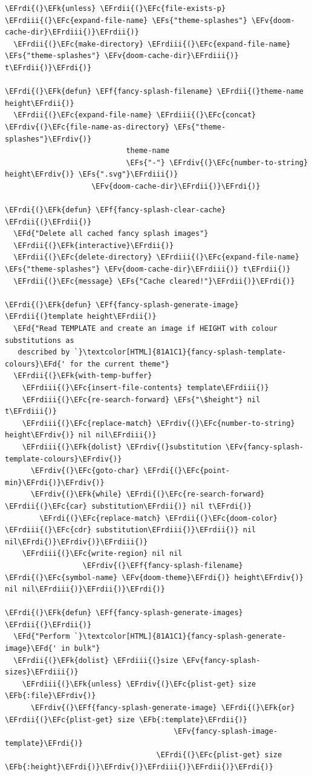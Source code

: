 \documentclass{scrartcl}
\newcommand{\EFk}[1]{\textcolor{EFk}{#1}} %
\newcommand{\EFd}[1]{\textcolor{EFd}{#1}} %
\newcommand{\EFs}[1]{\textcolor{EFs}{#1}} %
\newcommand{\EFb}[1]{\textcolor{EFb}{#1}} %
\newcommand{\EFc}[1]{\textcolor{EFc}{#1}} %
\newcommand{\EFv}[1]{\textcolor{EFv}{#1}} %
\newcommand{\EFf}[1]{\textcolor{EFf}{#1}} %
\newcommand{\EFrdi}[1]{#1} %
\newcommand{\EFrdii}[1]{#1} %
\newcommand{\EFrdiii}[1]{#1} %
\newcommand{\EFrdiv}[1]{#1} %
\begin{document}
\begin{Code}
\begin{Verbatim}[]
\EFrdi{(}\EFk{unless} \EFrdii{(}\EFc{file-exists-p} \EFrdiii{(}\EFc{expand-file-name} \EFs{"theme-splashes"} \EFv{doom-cache-dir}\EFrdiii{)}\EFrdii{)}
  \EFrdii{(}\EFc{make-directory} \EFrdiii{(}\EFc{expand-file-name} \EFs{"theme-splashes"} \EFv{doom-cache-dir}\EFrdiii{)} t\EFrdii{)}\EFrdi{)}

\EFrdi{(}\EFk{defun} \EFf{fancy-splash-filename} \EFrdii{(}theme-name height\EFrdii{)}
  \EFrdii{(}\EFc{expand-file-name} \EFrdiii{(}\EFc{concat} \EFrdiv{(}\EFc{file-name-as-directory} \EFs{"theme-splashes"}\EFrdiv{)}
                            theme-name
                            \EFs{"-"} \EFrdiv{(}\EFc{number-to-string} height\EFrdiv{)} \EFs{".svg"}\EFrdiii{)}
                    \EFv{doom-cache-dir}\EFrdii{)}\EFrdi{)}

\EFrdi{(}\EFk{defun} \EFf{fancy-splash-clear-cache} \EFrdii{(}\EFrdii{)}
  \EFd{"Delete all cached fancy splash images"}
  \EFrdii{(}\EFk{interactive}\EFrdii{)}
  \EFrdii{(}\EFc{delete-directory} \EFrdiii{(}\EFc{expand-file-name} \EFs{"theme-splashes"} \EFv{doom-cache-dir}\EFrdiii{)} t\EFrdii{)}
  \EFrdii{(}\EFc{message} \EFs{"Cache cleared!"}\EFrdii{)}\EFrdi{)}

\EFrdi{(}\EFk{defun} \EFf{fancy-splash-generate-image} \EFrdii{(}template height\EFrdii{)}
  \EFd{"Read TEMPLATE and create an image if HEIGHT with colour substitutions as
   described by `}\textcolor[HTML]{81A1C1}{fancy-splash-template-colours}\EFd{' for the current theme"}
  \EFrdii{(}\EFk{with-temp-buffer}
    \EFrdiii{(}\EFc{insert-file-contents} template\EFrdiii{)}
    \EFrdiii{(}\EFc{re-search-forward} \EFs{"\$height"} nil t\EFrdiii{)}
    \EFrdiii{(}\EFc{replace-match} \EFrdiv{(}\EFc{number-to-string} height\EFrdiv{)} nil nil\EFrdiii{)}
    \EFrdiii{(}\EFk{dolist} \EFrdiv{(}substitution \EFv{fancy-splash-template-colours}\EFrdiv{)}
      \EFrdiv{(}\EFc{goto-char} \EFrdi{(}\EFc{point-min}\EFrdi{)}\EFrdiv{)}
      \EFrdiv{(}\EFk{while} \EFrdi{(}\EFc{re-search-forward} \EFrdii{(}\EFc{car} substitution\EFrdii{)} nil t\EFrdi{)}
        \EFrdi{(}\EFc{replace-match} \EFrdii{(}\EFc{doom-color} \EFrdiii{(}\EFc{cdr} substitution\EFrdiii{)}\EFrdii{)} nil nil\EFrdi{)}\EFrdiv{)}\EFrdiii{)}
    \EFrdiii{(}\EFc{write-region} nil nil
                  \EFrdiv{(}\EFf{fancy-splash-filename} \EFrdi{(}\EFc{symbol-name} \EFv{doom-theme}\EFrdi{)} height\EFrdiv{)} nil nil\EFrdiii{)}\EFrdii{)}\EFrdi{)}

\EFrdi{(}\EFk{defun} \EFf{fancy-splash-generate-images} \EFrdii{(}\EFrdii{)}
  \EFd{"Perform `}\textcolor[HTML]{81A1C1}{fancy-splash-generate-image}\EFd{' in bulk"}
  \EFrdii{(}\EFk{dolist} \EFrdiii{(}size \EFv{fancy-splash-sizes}\EFrdiii{)}
    \EFrdiii{(}\EFk{unless} \EFrdiv{(}\EFc{plist-get} size \EFb{:file}\EFrdiv{)}
      \EFrdiv{(}\EFf{fancy-splash-generate-image} \EFrdi{(}\EFk{or} \EFrdii{(}\EFc{plist-get} size \EFb{:template}\EFrdii{)}
                                       \EFv{fancy-splash-image-template}\EFrdi{)}
                                   \EFrdi{(}\EFc{plist-get} size \EFb{:height}\EFrdi{)}\EFrdiv{)}\EFrdiii{)}\EFrdii{)}\EFrdi{)}


\end{Verbatim}
\end{Code}
\end{document}

